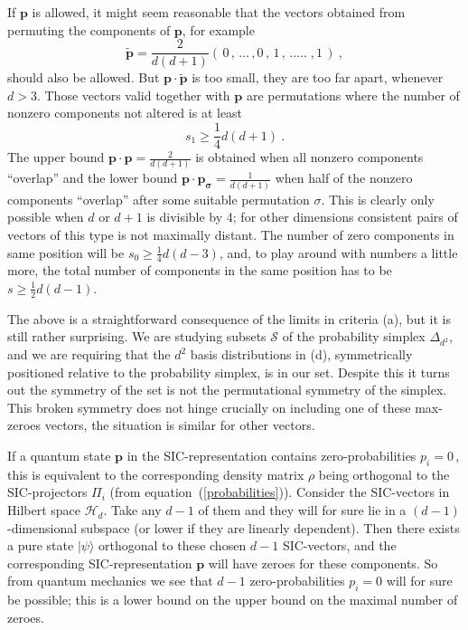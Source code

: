 \documentclass[letterpaper,11pt]{article}
\begin{document}
If $\mathbf p$ is allowed, it might seem reasonable that the vectors obtained from permuting the components of $\mathbf p$, for example
%
\begin{equation}
  \mathbf{\tilde p} = \frac{2}{d(d+1)}
        (\,0\,,\,\dots\,,0\, , \,1\,,\,.\dots.\;,1\,) \ ,
\end{equation}
%
should also be allowed. But $\mathbf{p\cdot\tilde p}$ is too small, they are too far apart, whenever $d>3$. Those vectors valid together with $\mathbf p$ are permutations where the number of nonzero components not altered is at least
%
\begin{equation}
  s_1 \geq \frac{1}{4}d(d+1) \ .
\end{equation}
%
The upper bound $\mathbf{p\cdot p}=\frac{2}{d(d+1)}$ is obtained when all nonzero components ``overlap'' and the lower bound  $\mathbf{p\cdot p_\sigma}=\frac{1}{d(d+1)}$ when half of the nonzero components ``overlap'' after some suitable permutation $\sigma$. This is clearly only possible when $d$ or $d+1$ is divisible by 4; for other dimensions consistent pairs of vectors of this type is not maximally distant. The number of zero components in same position will be $s_0 \geq \frac{1}{4}d(d-3)$, and, to play around with numbers a little more, the total number of components in the same position has to be $s \geq \frac{1}{2}d(d-1)$.

The above is a straightforward consequence of the limits in criteria (a), but it is still rather surprising. We are studying subsets $\mathcal S$ of the probability simplex $\Delta_{d^2}$, and we are requiring that the $d^2$ basis distributions in (d), symmetrically positioned relative to the probability simplex, is in our set. Despite this it turns out the symmetry of the set is not the permutational symmetry of the simplex. This broken symmetry does not hinge crucially on including one of these max-zeroes vectors, the situation is similar for other vectors.

If a quantum state $\mathbf p$ in the SIC-representation contains zero-probabilities $p_i=0\,$, this is equivalent to the corresponding density matrix $\rho$ being orthogonal to the SIC-projectors $\Pi_i$ (from equation~(\ref{probabilities})). Consider the SIC-vectors in Hilbert space $\mathcal H_d$. Take any $d-1$ of them and they will for sure lie in a $(d-1)$-dimensional subspace (or lower if they are linearly dependent). Then there exists a pure state $|\psi\rangle$ orthogonal to these chosen $d-1$ SIC-vectors, and the corresponding SIC-representation  $\mathbf p$ will have zeroes for these components. So from quantum mechanics we see that $d-1$ zero-probabilities $p_i=0$ will for sure be possible; this is a lower bound on the upper bound on the maximal number of zeroes.
\end{document}
